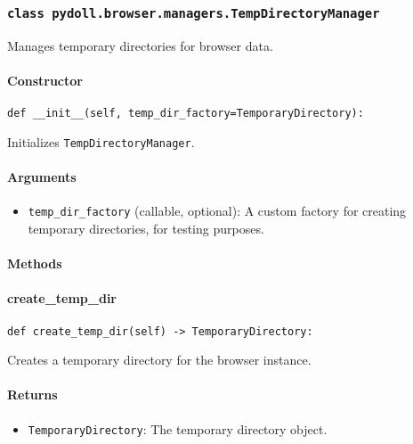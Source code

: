 \documentclass{article}
\begin{document}
\subsubsection*{\texttt{class pydoll.browser.managers.TempDirectoryManager}}
\noindent Manages temporary directories for browser data.

\paragraph{Constructor}

\begin{lstlisting}[style=pythonstyle]
def __init__(self, temp_dir_factory=TemporaryDirectory):
\end{lstlisting}

\noindent Initializes \lstinline[style=pythonstyle]|TempDirectoryManager|.

\paragraph{Arguments}

\begin{itemize}
    \item \lstinline[style=pythonstyle]|temp_dir_factory| (callable, optional): A custom factory for creating temporary directories, for testing purposes.
\end{itemize}

\paragraph{Methods}
\paragraph{create\_temp\_dir}

\begin{lstlisting}[style=pythonstyle]
def create_temp_dir(self) -> TemporaryDirectory:
\end{lstlisting}

\noindent Creates a temporary directory for the browser instance.

\paragraph{Returns}

\begin{itemize}
    \item \lstinline[style=pythonstyle]|TemporaryDirectory|: The temporary directory object.
\end{itemize}
\end{document}
